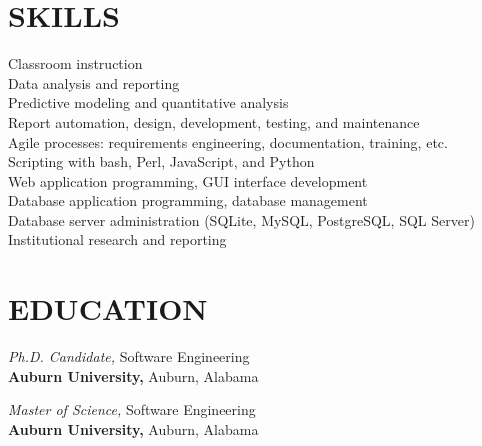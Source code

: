 \documentclass[margin, 10pt]{res} %
\begin{document}
\begin{resume}

 
\section{SKILLS}  

Classroom instruction\\
Data analysis and reporting\\
Predictive modeling and quantitative analysis\\
Report automation, design, development, testing, and maintenance\\
Agile processes: requirements engineering, documentation, training, etc.\\
Scripting with bash, Perl, JavaScript, and Python\\
Web application programming, GUI interface development\\
Database application programming, database management\\
Database server administration (SQLite, MySQL, PostgreSQL, SQL Server)\\
Institutional research and reporting\\


\section{EDUCATION}

{\it Ph.D. Candidate,} Software Engineering\\
\textbf{Auburn University,} Auburn, Alabama

{\it Master of Science,} Software Engineering\\
\textbf{Auburn University,} Auburn, Alabama


\end{resume}
\end{document}
